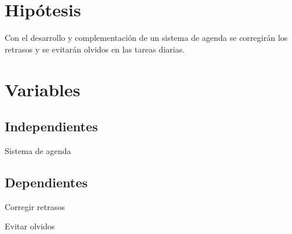 \section{Hipótesis}
\hspace{1.47cm}Con el desarrollo y complementación de un sistema de agenda se corregirán los 	retrasos y se evitarán  olvidos en las tareas diarias.
\section{Variables}

\subsection{Independientes}
\hspace{1.47cm}Sistema de agenda

\subsection{Dependientes}
\hspace{1.47cm}Corregir retrasos

\hspace{1.47cm}Evitar olvidos